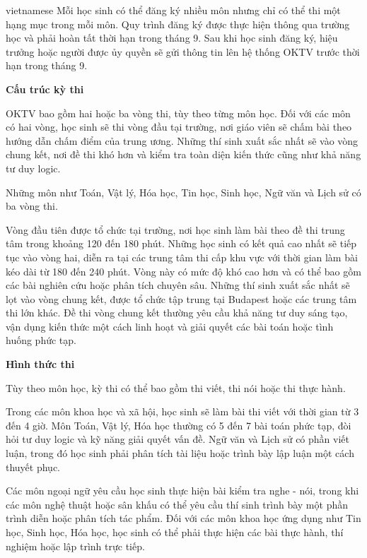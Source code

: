 \documentclass{article}
\begin{document}
\begin{otherlanguage*}{vietnamese}
Mỗi học sinh có thể đăng ký nhiều môn nhưng chỉ có thể thi một hạng mục trong mỗi môn. Quy trình đăng ký được thực hiện thông qua trường học và phải hoàn tất thời hạn trong tháng 9.
Sau khi học sinh đăng ký, hiệu trưởng hoặc người được ủy quyền sẽ gửi thông tin lên hệ thống OKTV trước thời hạn trong tháng 9.

\textbf{Cấu trúc kỳ thi}

OKTV bao gồm hai hoặc ba vòng thi, tùy theo từng môn học. Đối với các môn có hai vòng, học sinh sẽ thi vòng đầu tại trường, nơi giáo viên sẽ chấm bài theo hướng dẫn chấm điểm của trung ương.
Những thí sinh xuất sắc nhất sẽ vào vòng chung kết, nơi đề thi khó hơn và kiểm tra toàn diện kiến thức cũng như khả năng tư duy logic.

Những môn như Toán, Vật lý, Hóa học, Tin học, Sinh học, Ngữ văn và Lịch sử có ba vòng thi.
\begin{enumerate}[topsep=0pt, partopsep=0pt, itemsep=0pt]
    \ii Vòng đầu tiên được tổ chức tại trường, nơi học sinh làm bài theo đề thi trung tâm trong khoảng 120 đến 180 phút.
    \ii Những học sinh có kết quả cao nhất sẽ tiếp tục vào vòng hai, diễn ra tại các trung tâm thi cấp khu vực với thời gian làm bài kéo dài từ 180 đến 240 phút.
    Vòng này có mức độ khó cao hơn và có thể bao gồm các bài nghiên cứu hoặc phân tích chuyên sâu.
    \ii Những thí sinh xuất sắc nhất sẽ lọt vào vòng chung kết, được tổ chức tập trung tại Budapest hoặc các trung tâm thi lớn khác.
    Đề thi vòng chung kết thường yêu cầu khả năng tư duy sáng tạo, vận dụng kiến thức một cách linh hoạt và giải quyết các bài toán hoặc tình huống phức tạp.
\end{enumerate}

\textbf{Hình thức thi}

Tùy theo môn học, kỳ thi có thể bao gồm thi viết, thi nói hoặc thi thực hành.

Trong các môn khoa học và xã hội, học sinh sẽ làm bài thi viết với thời gian từ 3 đến 4 giờ.
Môn Toán, Vật lý, Hóa học thường có 5 đến 7 bài toán phức tạp, đòi hỏi tư duy logic và kỹ năng giải quyết vấn đề.
Ngữ văn và Lịch sử có phần viết luận, trong đó học sinh phải phân tích tài liệu hoặc trình bày lập luận một cách thuyết phục.

Các môn ngoại ngữ yêu cầu học sinh thực hiện bài kiểm tra nghe - nói, trong khi các môn nghệ thuật hoặc sân khấu có thể yêu cầu thí sinh trình bày một phần trình diễn hoặc phân tích tác phẩm.
Đối với các môn khoa học ứng dụng như Tin học, Sinh học, Hóa học, học sinh có thể phải thực hiện các bài thực hành, thí nghiệm hoặc lập trình trực tiếp.


\end{otherlanguage*}
\end{document}
